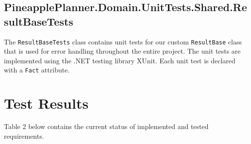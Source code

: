 \documentclass{article}
\begin{document}

\bigbreak

\subsection{PineapplePlanner.Domain.UnitTests.Shared.ResultBaseTests}

The \verb|ResultBaseTests| class contains unit tests for our custom \verb|ResultBase| class that is used for error handling throughout the entire project.
The unit tests are implemented using the .NET testing library XUnit.
Each unit test is declared with a \verb|Fact| attribute.


\bigbreak

\clearpage
\section{Test Results}
Table 2 below contains the current status of implemented and tested requirements.
\end{document}

